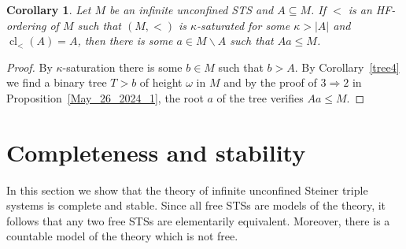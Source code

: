 \documentclass[a4paper, 11pt]{article}
\DeclareMathOperator{\cl}{cl}
\theoremstyle{note}
\newtheorem{cor}[thm]{Corollary}
\begin{document}
\begin{cor}\label{June_25_2024_4}  Let $M$ be  an infinite unconfined STS  and $A\subseteq M$.  If $<$ is an HF-ordering of $M$ such that $(M,<)$ is  $\kappa$-saturated for some $\kappa>|A|$ and $\cl_<(A)=A$, then there is some $a\in M\smallsetminus A$  such that  $Aa\leq M$.
\end{cor}
\begin{proof}   By $\kappa$-saturation there is some $b\in M$  such that $b>A$. By  Corollary~\ref{tree4} we find a binary tree $T>b$ of height $\omega$ in $M$ and by the proof of $ 3 \Rightarrow 2$ in Proposition~\ref{May_26_2024_1}, the root $a$ of the tree verifies $Aa\leq M$.
\end{proof}







	\section{Completeness and stability} \label{section7}
	
 In this section we show that the theory of infinite unconfined Steiner triple systems is complete and stable.  Since all free STSs are models of the theory, it follows that any two free STSs are elementarily equivalent. Moreover, there is a countable model of the theory which is not free.
\end{document}
